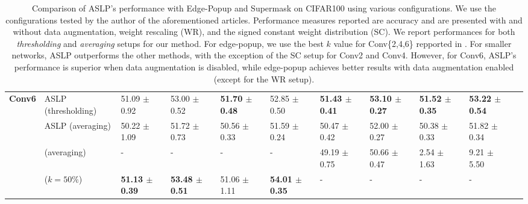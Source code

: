\begin{table}[htbp]
{\begin{tabular}{lllllllllll}
      \multirow{4}{*}{\textbf{Conv6}} & ASLP (thresholding) & 51.09 $\pm$ 0.92 & 53.00 $\pm$ 0.52 & \textbf{51.70 $\pm$ 0.48} & 52.85 $\pm$ 0.50 & \textbf{51.43 $\pm$ 0.41} & \textbf{53.10 $\pm$ 0.27} & \textbf{51.52 $\pm$ 0.35} & \textbf{53.22 $\pm$ 0.54} \\
      & ASLP (averaging) & 50.22 $\pm$ 1.09 & 51.72 $\pm$ 0.73 & 50.56 $\pm$ 0.33 & 51.59 $\pm$ 0.24 & 50.47 $\pm$ 0.42 & 52.00 $\pm$ 0.27 & 50.38 $\pm$ 0.33 & 51.82 $\pm$ 0.34 \\
      & \cite{DBLP:conf/nips/ZhouLLY19} (averaging) & - & - & - & - & 49.19 $\pm$ 0.75 & 50.66 $\pm$ 0.47 & 2.54 $\pm$ 1.63 & 9.21 $\pm$ 5.50 \\
      & \cite{DBLP:conf/cvpr/RamanujanWKFR20} ($k=50\%$) & \textbf{51.13 $\pm$ 0.39} & \textbf{53.48 $\pm$ 0.51} & 51.06 $\pm$ 1.11 & \textbf{54.01 $\pm$ 0.35} & - & - & - & - \\
      \bottomrule
    \end{tabular}
  } \caption{Comparison of ASLP's performance with Edge-Popup and Supermask
  \cite{DBLP:conf/cvpr/RamanujanWKFR20,DBLP:conf/nips/ZhouLLY19} on CIFAR100
  using various configurations. We use the configurations tested by the author
  of the aforementioned articles. Performance measures reported are accuracy and
  are presented with and without data augmentation, weight rescaling (WR), and
  the signed constant weight distribution (SC). We report performances for both
  \textit{thresholding} and \textit{averaging} setups for our method. For edge-popup, we use
  the best $k$ value for Conv\{2,4,6\} repported in
  \cite{DBLP:conf/cvpr/RamanujanWKFR20}. For smaller networks, ASLP outperforms
  the other methods, with the exception of the SC setup for Conv2 and Conv4.
  However, for Conv6, ASLP's performance is superior when data augmentation is
  disabled, while edge-popup achieves better results with data augmentation
  enabled (except for the WR setup).}
  \label{tab:chap2:con_performances_comparison_cifar100}
\end{table}


